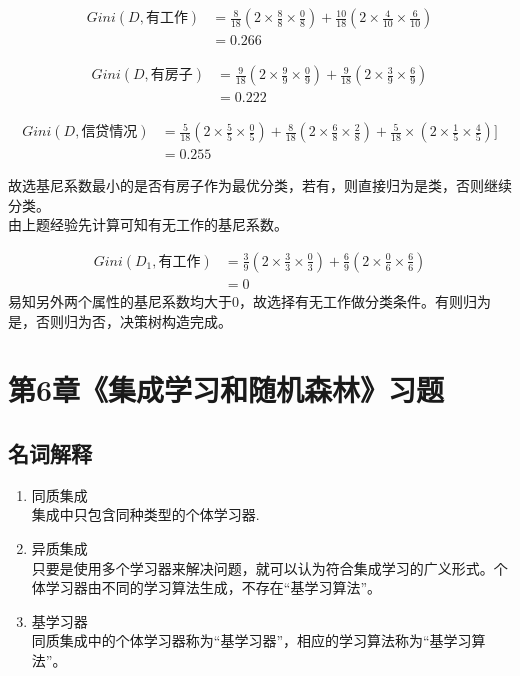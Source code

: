 \documentclass{ctexart}
\begin{document}
\begin{align*}
Gini(D,\mbox{有工作})&=\frac{8}{18}(2\times\frac{8}{8}\times\frac{0}{8})+\frac{10}{18}(2\times\frac{4}{10}\times\frac{6}{10})\\
&=0.266
\end{align*}

\begin{align*}
Gini(D,\mbox{有房子})&=\frac{9}{18}(2\times\frac{9}{9}\times\frac{0}{9})+\frac{9}{18}(2\times\frac{3}{9}\times\frac{6}{9})\\
&=0.222
\end{align*}

\begin{align*}
Gini(D,\mbox{信贷情况})&=\frac{5}{18}(2\times\frac{5}{5}\times\frac{0}{5})+\frac{8}{18}(2\times\frac{6}{8}\times\frac{2}{8})+\frac{5}{18}\times(2\times\frac{1}{5}\times\frac{4}{5})]\\
&=0.255
\end{align*}

故选基尼系数最小的是否有房子作为最优分类，若有，则直接归为是类，否则继续分类。\\由上题经验先计算可知有无工作的基尼系数。

\begin{align*}
Gini(D_1,\mbox{有工作})&=\frac{3}{9}(2\times\frac{3}{3}\times\frac{0}{3})+\frac{6}{9}(2\times\frac{0}{6}\times\frac{6}{6})\\
&=0
\end{align*}
易知另外两个属性的基尼系数均大于0，故选择有无工作做分类条件。有则归为是，否则归为否，决策树构造完成。

\section*{第6章《集成学习和随机森林》习题}

\subsection*{名词解释}
\begin{enumerate}[(1)]
\item 同质集成\\
集成中只包含同种类型的个体学习器.
\item 异质集成\\
只要是使用多个学习器来解决问题，就可以认为符合集成学习的广义形式。个体学习器由不同的学习算法生成，不存在“基学习算法”。
\item 基学习器\\
同质集成中的个体学习器称为“基学习器”，相应的学习算法称为“基学习算法”。
\end{enumerate}
\end{document}

